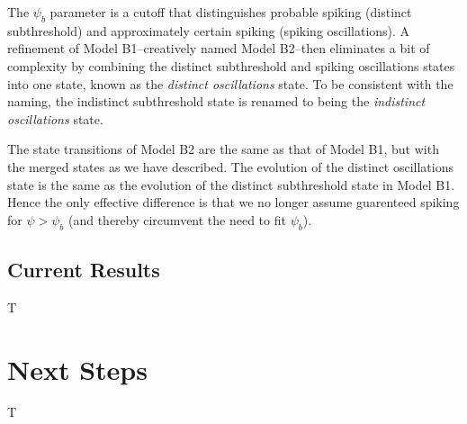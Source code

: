 \documentclass[letterpaper,12pt]{article}
\numberwithin{table}{section}
\numberwithin{figure}{section}
\numberwithin{equation}{section}
\begin{document}
\begin{flushleft}

    The $\psi_b$ parameter is a cutoff that distinguishes probable spiking (distinct subthreshold) and approximately certain spiking (spiking oscillations). A refinement of Model B1--creatively named Model B2--then eliminates a bit of complexity by combining the distinct subthreshold and spiking oscillations states into one state, known as the \textit{distinct oscillations} state. To be consistent with the naming, the indistinct subthreshold state is renamed to being the \textit{indistinct oscillations} state.

    The state transitions of Model B2 are the same as that of Model B1, but with the merged states as we have described. The evolution of the distinct oscillations state is the same as the evolution of the distinct subthreshold state in Model B1. Hence the only effective difference is that we no longer assume guarenteed spiking for $\psi > \psi_b$ (and thereby circumvent the need to fit $\psi_b$).

    \subsection{Current Results}
    T


    \pagebreak

    \section{Next Steps}
    T

    \pagebreak

    
    

\end{flushleft}
\end{document}
